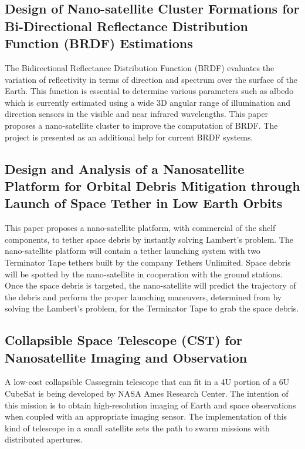 \subsection{Design of Nano-satellite Cluster Formations for Bi-Directional Reflectance Distribution Function (BRDF) Estimations}

The Bidirectional Reflectance Distribution Function (BRDF) evaluates the variation of reflectivity in terms of direction and spectrum over the surface of the Earth. This function is essential to determine various parameters such as albedo which is currently estimated using a wide 3D angular range of illumination and direction sensors in the visible and near infrared wavelengths. This paper proposes a nano-satellite cluster to improve the computation of BRDF. The project is presented as an additional help for current BRDF systems.\cite{Nag_BRDF}

\subsection{Design and Analysis of a Nanosatellite Platform for Orbital Debris Mitigation through Launch of Space Tether in Low Earth Orbits}

This paper proposes a nano-satellite platform, with commercial of the shelf components, to tether space debris by instantly solving Lambert's problem. The nano-satellite platform will contain a tether launching system with two Terminator Tape tethers built by the company Tethers Unlimited. Space debris will be spotted by the nano-satellite in cooperation with the ground stations. Once the space debris is targeted, the nano-satellite will predict the trajectory of the debris and perform the proper launching maneuvers, determined from by solving the Lambert's problem, for the Terminator Tape to grab the space debris.\cite{Asundi_SpaceDebris} 

\subsection{Collapsible Space Telescope (CST) for Nanosatellite Imaging and Observation}

A low-cost collapsible Cassegrain telescope that can fit in a 4U portion of a 6U CubeSat is being developed by NASA Ames Research Center. The intention of this mission is to obtain high-resolution imaging of Earth and space observations when coupled with an appropriate imaging sensor. The implementation of this kind of telescope in a small satellite sets the path to swarm missions with distributed apertures.\cite{Elwood_CollapsibleTelescope}

